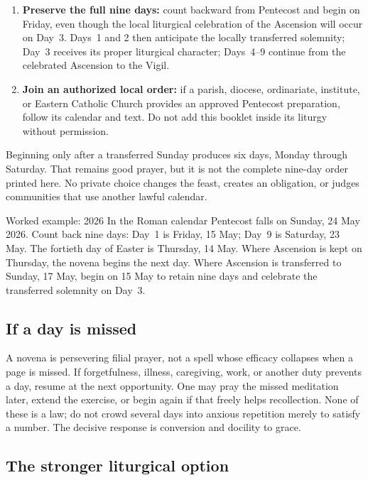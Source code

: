\begin{enumerate}
\item \textbf{Preserve the full nine days:} count backward from Pentecost and begin on Friday, even though the local liturgical celebration of the Ascension will occur on Day~3. Days~1 and 2 then anticipate the locally transferred solemnity; Day~3 receives its proper liturgical character; Days~4--9 continue from the celebrated Ascension to the Vigil.
\item \textbf{Join an authorized local order:} if a parish, diocese, ordinariate, institute, or Eastern Catholic Church provides an approved Pentecost preparation, follow its calendar and text. Do not add this booklet inside its liturgy without permission.
\end{enumerate}

Beginning only after a transferred Sunday produces six days, Monday through Saturday. That remains good prayer, but it is not the complete nine-day order printed here. No private choice changes the feast, creates an obligation, or judges communities that use another lawful calendar.

\begin{studybox}{Worked example: 2026}
In the Roman calendar Pentecost falls on Sunday, 24 May 2026. Count back nine days: Day~1 is Friday, 15 May; Day~9 is Saturday, 23 May. The fortieth day of Easter is Thursday, 14 May. Where Ascension is kept on Thursday, the novena begins the next day. Where Ascension is transferred to Sunday, 17 May, begin on 15 May to retain nine days and celebrate the transferred solemnity on Day~3.
\end{studybox}

\subsection{If a day is missed}

A novena is persevering filial prayer, not a spell whose efficacy collapses when a page is missed. If forgetfulness, illness, caregiving, work, or another duty prevents a day, resume at the next opportunity. One may pray the missed meditation later, extend the exercise, or begin again if that freely helps recollection. None of these is a law; do not crowd several days into anxious repetition merely to satisfy a number. The decisive response is conversion and docility to grace.

\subsection{The stronger liturgical option}


